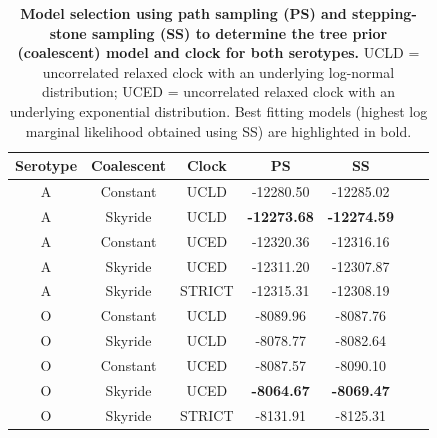 \documentclass[a4paper,10pt]{article}
\begin{document}
\newpage
\begin{table}[H]
\caption{\textbf{Model selection using path sampling (PS) and stepping-stone sampling (SS) to determine the tree prior (coalescent) model and clock for both serotypes.}
UCLD = uncorrelated relaxed clock with an underlying log-normal distribution; UCED = uncorrelated relaxed clock with an underlying exponential distribution.
Best fitting models (highest log marginal likelihood obtained using SS) are highlighted in bold.}
\begin{center}
\begin{tabular}{ccccccc}
\toprule
Serotype	&Coalescent	&Clock	& PS  & SS\\             
\midrule
A	&Constant	&UCLD	& -12280.50& -12285.02\\
A	&Skyride 	&UCLD	& \textbf{-12273.68} & \textbf{-12274.59}\\
A	&Constant	&UCED	& -12320.36 & -12316.16\\
A	&Skyride 	&UCED	& -12311.20 & -12307.87\\
A       &Skyride       &STRICT & -12315.31 & -12308.19\\
O	&Constant	&UCLD	& -8089.96& -8087.76\\
O	&Skyride 	&UCLD	& -8078.77 & -8082.64\\
O	&Constant	&UCED	&-8087.57 & -8090.10\\
O	&Skyride 	&UCED	& \textbf{-8064.67}& \textbf{-8069.47}\\
O       &Skyride       &STRICT & -8131.91& -8125.31\\
\bottomrule
\end{tabular}
\end{center}
\begin{flushleft}
\end{flushleft}
\label{stab:treeclockselection}
 \end{table}
\end{document}
